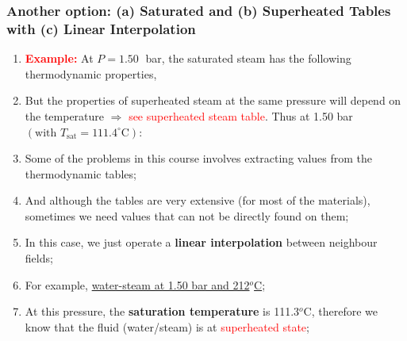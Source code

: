 \documentclass[10pt,compress,handout,ignorenonframetext]{beamer}
\begin{document}
\begin{frame}
  \frametitle{Another option: (a) Saturated and (b) Superheated Tables with (c) Linear Interpolation}
\noindent
\begin{enumerate}\scriptsize
\item <1-> {\bf \textcolor{red}{Example:}} At $P=1.50\;$ bar, the saturated steam has the following thermodynamic properties,
\begin{center}
\end{center}

\item <3-> But the properties of superheated steam at the same pressure will depend on the temperature $\Rightarrow$ \textcolor{red}{see superheated steam table}. Thus at 1.50 bar $\left(\text{with }T_{\text{sat}}=111.4^{\circ}\text{C}\right)$:
\item <4-> Some of the problems in this course involves extracting values from the thermodynamic tables;
\item <5-> And although the tables are very extensive (for most of the materials), sometimes we need values that can not be directly found on them;
\item <6-> In this case, we just operate a {\bf linear interpolation} between neighbour fields;
\item <7-> For example, \underline{water-steam at 1.50 bar and 212$^{o}$C};
\item <8-> At this pressure, the {\bf saturation temperature} is 111.3$^{o}$C, therefore we know that the fluid (water/steam) is at \textcolor{red}{superheated state};

\end{enumerate}

\end{frame}
\end{document}
